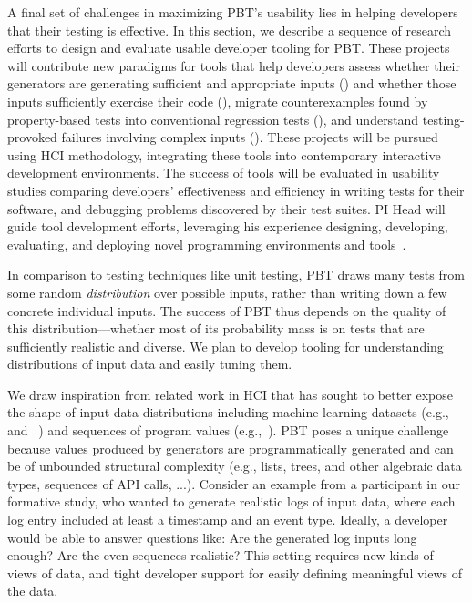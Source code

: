 A final set of challenges in maximizing PBT's usability lies in
helping developers
 that their testing is effective. In this section, we
describe a sequence of research efforts to design and evaluate usable developer
tooling for PBT. These projects will contribute new paradigms for tools that
help developers assess whether their generators are generating sufficient and
appropriate inputs () and whether those
inputs sufficiently exercise their code (), migrate
counterexamples found by property-based tests into conventional regression tests (),
and understand testing-provoked failures involving complex inputs
(). These projects will be pursued using HCI
methodology, integrating these tools into contemporary interactive development
environments. The success of tools will be evaluated in usability studies
comparing developers' effectiveness and efficiency in writing tests for their
software, and debugging problems discovered by their test suites.  PI Head will
guide tool development efforts, leveraging his
experience designing, developing, evaluating, and deploying novel programming
environments and
tools~\cite{ref:head2015tutorons,ref:suzuki2017tracediff,ref:head2017writing,ref:head2018when,ref:head2018interactive,ref:head2019managing,ref:head2020composing}.

%
In comparison to testing techniques like unit testing, PBT draws many
tests from some
random {\em distribution} over possible inputs, rather than writing down a few
concrete individual inputs. The success  of
PBT thus depends on the quality of this distribution---whether
most of its probability mass is on tests that are sufficiently
realistic and diverse. We plan
to develop tooling for
understanding distributions of input data and easily tuning them.

We draw inspiration from related work in HCI that has sought to better expose
the shape of input data distributions including
machine learning datasets
(e.g.,~\cite{ref:hohman2019gamut} and
~\cite{ref:hohman2020understanding}) and sequences of program values
(e.g.,~\cite{ref:kang2017omnicode}).
PBT poses a unique challenge because values produced by generators are
programmatically generated and
can be of unbounded structural
complexity (e.g., lists, trees, and other algebraic data types,
sequences of API calls, ...).
Consider an
example from a participant in our formative study, who wanted to generate
realistic logs of input data, where each log entry included at least a timestamp
and an event type. Ideally, a developer would be able to answer
questions like: Are the generated log inputs long enough? Are the even sequences
realistic? This setting requires new kinds of views of data, and tight
developer support for easily defining meaningful views of the data.

